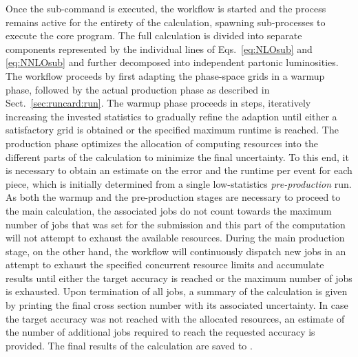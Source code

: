 \documentclass{SciPost}
\DeclareRobustCommand{\command}[1]{\makebox{\lstinline[language=commands]^#1^}}
\begin{document}
Once the \command{submit} sub-command is executed, the workflow is started and the process remains active for the entirety of the calculation, spawning sub-processes to execute the core \command{NNLOJET} program.
The full calculation is divided into separate components represented by the individual lines of Eqs.~\eqref{eq:NLOsub} and \eqref{eq:NNLOsub} and further decomposed into independent partonic luminosities.
The workflow proceeds by first adapting the phase-space grids in a warmup phase, followed by the actual production phase as described in Sect.~\ref{sec:runcard:run}.
The warmup phase proceeds in steps, iteratively increasing the invested statistics to gradually refine the adaption until either a satisfactory grid is obtained or the specified maximum runtime is reached.
The production phase optimizes the allocation of computing resources into the different parts of the calculation to minimize the final uncertainty.
To this end, it is necessary to obtain an estimate on the error and the runtime per event for each piece, which is initially determined from a single low-statistics \textit{pre-production} run.
As both the warmup and the pre-production stages are necessary to proceed to the main calculation, the associated jobs do not count towards the maximum number of jobs that was set for the submission and this part of the computation will not attempt to exhaust the available resources.
During the main production stage, on the other hand, the workflow will continuously dispatch new jobs in an attempt to exhaust the specified concurrent resource limits and accumulate results until either the target accuracy is reached or the maximum number of jobs is exhausted.
Upon termination of all jobs, a summary of the calculation is given by printing the final cross section number with its associated uncertainty.
In case the target accuracy was not reached with the allocated resources, an estimate of the number of additional jobs required to reach the requested accuracy is provided.
The final results of the calculation are saved to \command{<run-path>/result/final}.
%
\end{document}
